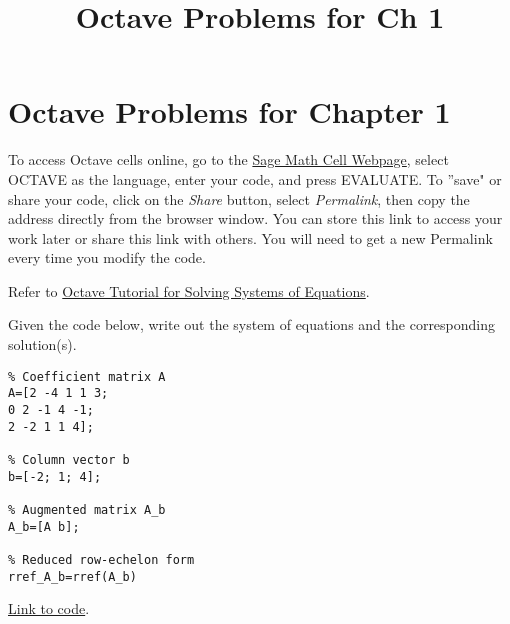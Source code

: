 \documentclass{ximera}
\title{Octave Problems for Ch 1} \license{CC BY-NC-SA 4.0}
\begin{document}
\begin{abstract}
\end{abstract}
\maketitle

\section*{Octave Problems for Chapter 1}

To access Octave cells online, go to the \href{https://sagecell.sagemath.org/}{Sage Math Cell Webpage}, select OCTAVE as the language, enter your code, and press EVALUATE.  
To ''save" or share your code, click on the \emph{Share} button, select \emph{Permalink}, then copy the address directly from the browser window.  You can store this link to access your work later or share this link with others.  You will need to get a new Permalink every time you modify the code.

Refer to \href{https://ximera.osu.edu/linearalgebrav3/XOctaveTutorial/octave/systems}{Octave Tutorial for Solving Systems of Equations}.

\begin{problem}\label{prob_oct_0}
    Given the code below, write out the system of equations and the corresponding solution(s).

    \begin{verbatim}
% Coefficient matrix A
A=[2 -4 1 1 3;
0 2 -1 4 -1;
2 -2 1 1 4];

% Column vector b
b=[-2; 1; 4];

% Augmented matrix A_b
A_b=[A b];

% Reduced row-echelon form
rref_A_b=rref(A_b)
    \end{verbatim}

\href{https://sagecell.sagemath.org/?z=eJxFjcEKwjAQRO-B_MNcCnoI2NpbySH4B16LFJtuNNA0sKTq57sVVBaGGeaxU-GUKYToIy0F6Vo4vuC0crZvYFrUcsdOqwMk1mhFJIlvPlV7kaRVJV_mNS14kC-ZMWo12t40Heruz7j1lmSFpt_OIKCI7R3GL3WmafXCcH4a8nea84KQOWnFTGHY8M3sxOzf0oYzHQ==&lang=octave&interacts=eJyLjgUAARUAuQ==}{Link to code}.    
\end{problem}
\end{document}
